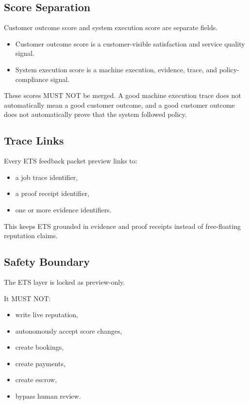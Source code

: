 \subsection{Score Separation}

Customer outcome score and system execution score are separate fields.

\begin{itemize}
  \item Customer outcome score is a customer-visible satisfaction and service quality signal.
  \item System execution score is a machine execution, evidence, trace, and policy-compliance signal.
\end{itemize}

These scores MUST NOT be merged. A good machine execution trace does not automatically mean a good customer outcome, and a good customer outcome does not automatically prove that the system followed policy.

\subsection{Trace Links}

Every ETS feedback packet preview links to:

\begin{itemize}
  \item a job trace identifier,
  \item a proof receipt identifier,
  \item one or more evidence identifiers.
\end{itemize}

This keeps ETS grounded in evidence and proof receipts instead of free-floating reputation claims.

\subsection{Safety Boundary}

The ETS layer is locked as preview-only.

It MUST NOT:

\begin{itemize}
  \item write live reputation,
  \item autonomously accept score changes,
  \item create bookings,
  \item create payments,
  \item create escrow,
  \item bypass human review.
\end{itemize}

